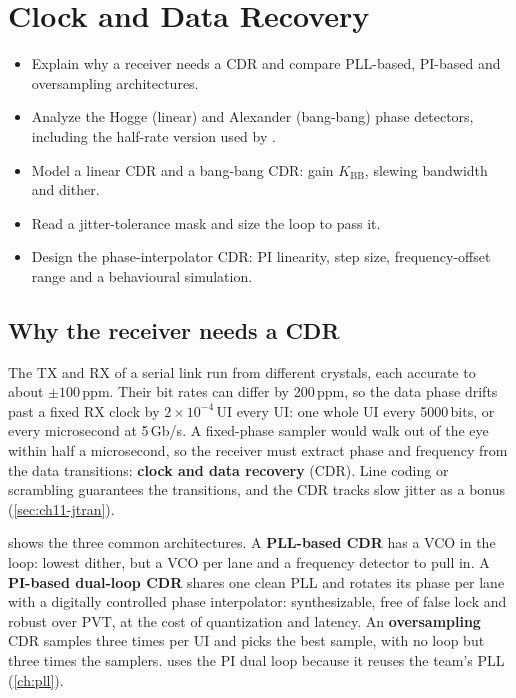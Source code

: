 \chapter{Clock and Data Recovery}\label{ch:cdr}

\begin{objectives}
\begin{itemize}
  \item Explain why a receiver needs a CDR and compare PLL-based, PI-based and oversampling architectures.
  \item Analyze the Hogge (linear) and Alexander (bang-bang) phase detectors, including the half-rate version used by \OS{}.
  \item Model a linear CDR and a bang-bang CDR: gain $K_\mathrm{BB}$, slewing bandwidth and dither.
  \item Read a jitter-tolerance mask and size the loop to pass it.
  \item Design the \OS{} phase-interpolator CDR: PI linearity, step size, frequency-offset range and a behavioural simulation.
\end{itemize}
\end{objectives}

\section{Why the receiver needs a CDR}\label{sec:ch13-why}

The TX and RX of a serial link run from different crystals, each accurate to about $\pm100$\,ppm. Their bit rates can differ by 200\,ppm, so the data phase drifts past a fixed RX clock by $2\times10^{-4}$\,UI every UI: one whole UI every 5000\,bits, or every microsecond at 5\,Gb/s. A fixed-phase sampler would walk out of the eye within half a microsecond, so the receiver must extract phase and frequency from the data transitions: \textbf{clock and data recovery} (CDR). Line coding or scrambling guarantees the transitions, and the CDR tracks slow jitter as a bonus (\cref{sec:ch11-jtran}).

 shows the three common architectures. A \textbf{PLL-based CDR} has a VCO in the loop: lowest dither, but a VCO per lane and a frequency detector to pull in. A \textbf{PI-based dual-loop CDR} shares one clean PLL and rotates its phase per lane with a digitally controlled phase interpolator: synthesizable, free of false lock and robust over PVT, at the cost of quantization and latency. An \textbf{oversampling} CDR samples three times per UI and picks the best sample, with no loop but three times the samplers. \OS{} uses the PI dual loop because it reuses the team's PLL (\cref{ch:pll}).

